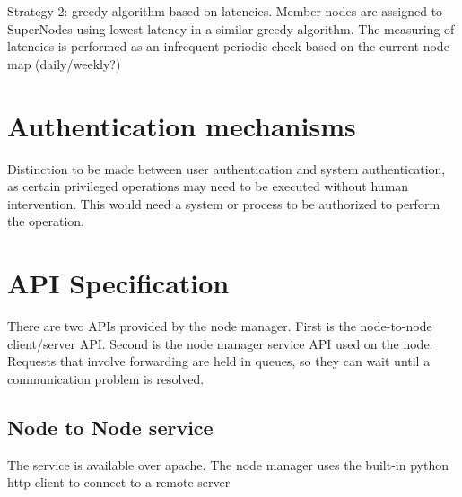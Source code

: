 \documentclass[oneside,12pt]{memoir}
\begin{document}
Strategy 2:  greedy algorithm based on latencies.  Member nodes are assigned to SuperNodes using lowest latency in a similar greedy algorithm.  The measuring of latencies is performed as an infrequent periodic check based on the current node map (daily/weekly?)




\section{Authentication mechanisms}
Distinction to be made between user authentication and system authentication, as certain privileged operations may need to be executed without human intervention. This would need a system or process to be authorized to perform the operation. 




\section{API Specification}

There are two APIs provided by the node manager.  First is the node-to-node client/server API.  Second is the node manager service API used on the node.  Requests that involve forwarding are held in queues, so they can wait until a communication problem is resolved. 

\subsection{Node to Node service}

The service is available over apache. The node manager uses the built-in python http client to connect to a remote server
\end{document}
